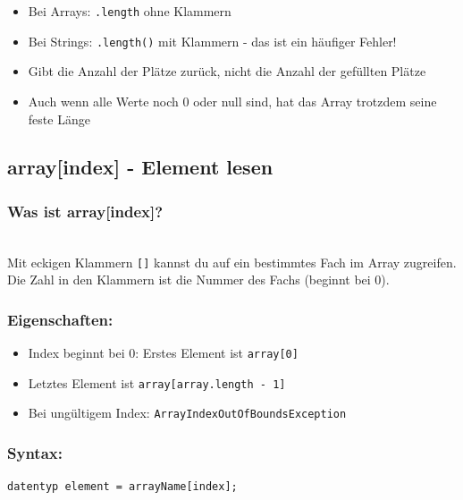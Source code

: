 \begin{achtung}
	\begin{itemize}
		\item Bei Arrays: \texttt{.length} ohne Klammern
		\item Bei Strings: \texttt{.length()} mit Klammern - das ist ein häufiger Fehler!
		\item Gibt die Anzahl der Plätze zurück, nicht die Anzahl der gefüllten Plätze
		\item Auch wenn alle Werte noch 0 oder null sind, hat das Array trotzdem seine feste Länge
	\end{itemize}
\end{achtung}

\newpage


\subsection*{array[index] - Element lesen}

\subsubsection*{Was ist array[index]?}\\
Mit eckigen Klammern \texttt{[]} kannst du auf ein bestimmtes Fach im Array zugreifen.
Die Zahl in den Klammern ist die Nummer des Fachs (beginnt bei 0).

\subsubsection*{Eigenschaften:}
\begin{itemize}
	\item Index beginnt bei 0: Erstes Element ist \texttt{array[0]}
	\item Letztes Element ist \texttt{array[array.length - 1]}
	\item Bei ungültigem Index: \texttt{ArrayIndexOutOfBoundsException}
\end{itemize}

\subsubsection*{Syntax:}
\begin{lstlisting}
datentyp element = arrayName[index];
\end{lstlisting}

